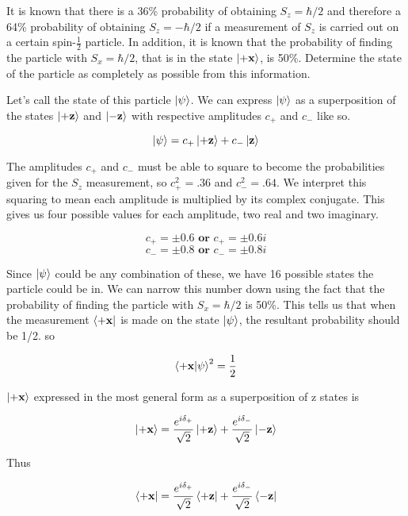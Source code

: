 \documentclass[11pt, oneside]{article}   	%
\begin{document}
\begin{center}
\begin{tcolorbox}[title=1.14 \hfill Isaac Baer , halign title=center]

It is known that there is a 36\% probability of obtaining $S_z=\hbar/2$ and therefore a 64\% probability of obtaining $S_z=-\hbar/2$ if a measurement of $S_z$ is carried out on a certain spin-$\frac{1}{2}$ particle. In addition, it is known that the probability of finding the particle with $S_x=\hbar/2$, that is in the state $\ket{+\textbf{x}}$, is 50\%. Determine the state of the particle as completely as possible from this information.
\end{tcolorbox}
\end{center}

Let's call the state of this particle $\ket{\psi}$. We can express $\ket{\psi}$ as a superposition of the states $\ket{+\textbf{z}}$ and $\ket{-\textbf{z}}$ with respective amplitudes $c_+$ and $c_-$ like so.

\[\ket{\psi}=c_+\ket{+\textbf{z}} + c_-\ket{\textbf{z}}\]

The amplitudes $c_+$ and $c_-$ must be able to square to become the probabilities given for the $S_z$ measurement, so $c_+^2=.36$ and $c_-^2=.64$. We interpret this squaring to mean each amplitude is multiplied by its complex conjugate. This gives us four possible values for each amplitude, two real and two imaginary.

\[
c_+=\pm0.6 \textbf{ or } c_+=\pm0.6i
\]\[
c_-=\pm0.8 \textbf{ or } c_-=\pm0.8i
\]

Since $\ket{\psi}$ could be any combination of these, we have 16 possible states the particle could be in. We can narrow this number down using the fact that the probability of finding the particle with $S_x=\hbar/2$ is 50\%. This tells us that when the measurement $\bra{+\textbf{x}}$ is made on the state $\ket{\psi}$, the resultant probability should be 1/2. so

\[
\braket{+\textbf{x}|\psi}^2=\frac{1}{2}
\]

$\ket{+\textbf{x}}$ expressed in the most general form as a superposition of z states is 

\[
\ket{+\textbf{x}}=\frac{e^{i\delta_+}}{\sqrt{2}}\ket{+\textbf{z}}+\frac{e^{i\delta_-}}{\sqrt{2}}\ket{-\textbf{z}}
\]

Thus 

\[
\bra{+\textbf{x}}=\frac{e^{i\delta_+}}{\sqrt{2}}\bra{+\textbf{z}}+\frac{e^{i\delta_-}}{\sqrt{2}}\bra{-\textbf{z}}
\]
\end{document}
